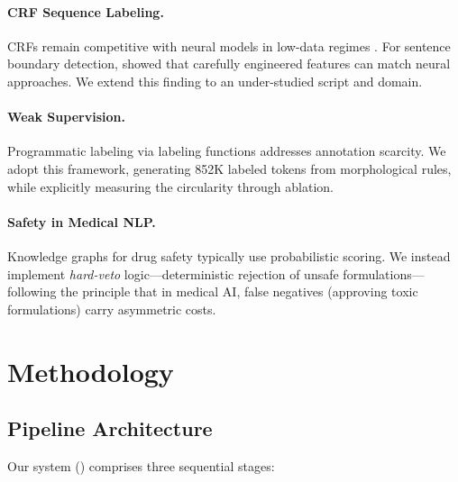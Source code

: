 \documentclass[11pt,a4paper]{article}
\begin{document}
\paragraph{CRF Sequence Labeling.} CRFs \citep{lafferty2001conditional} remain competitive with neural models in low-data regimes \citep{yang2018design}. For sentence boundary detection, \citet{read2012sentence} showed that carefully engineered features can match neural approaches. We extend this finding to an under-studied script and domain.

\paragraph{Weak Supervision.} Programmatic labeling via labeling functions \citep{ratner2017snorkel} addresses annotation scarcity. We adopt this framework, generating 852K labeled tokens from morphological rules, while explicitly measuring the circularity through ablation.

\paragraph{Safety in Medical NLP.} Knowledge graphs for drug safety \citep{lin2020kgnn, bean2017knowledge} typically use probabilistic scoring. We instead implement \textit{hard-veto} logic—deterministic rejection of unsafe formulations—following the principle that in medical AI, false negatives (approving toxic formulations) carry asymmetric costs.

\section{Methodology}

\subsection{Pipeline Architecture}

Our system () comprises three sequential stages:
\end{document}
